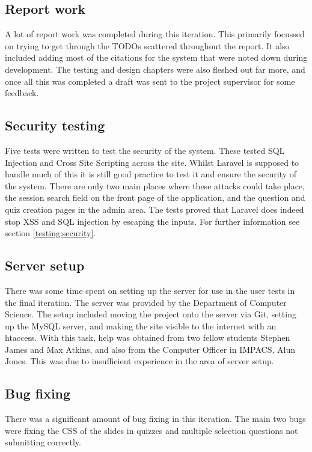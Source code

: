 \subsection{Report work}
A lot of report work was completed during this iteration. This primarily focussed on trying to get through the TODOs scattered throughout the report. It also included adding most of the citations for the system that were noted down during development. The testing and design chapters were also fleshed out far more, and once all this was completed a draft was sent to the project supervisor for some feedback.

\subsection{Security testing}
Five tests were written to test the security of the system. These tested SQL Injection and Cross Site Scripting across the site. Whilst Laravel is supposed to handle much of this it is still good practice to test it and ensure the security of the system. There are only two main places where these attacks could take place, the session search field on the front page of the application, and the question and quiz creation pages in the admin area. The tests proved that Laravel does indeed stop XSS and SQL injection by escaping the inputs. For further information see section \ref{testing:security}.

\subsection{Server setup}
There was some time spent on setting up the server for use in the user tests in the final iteration. The server was provided by the Department of Computer Science. The setup included moving the project onto the server via Git, setting up the MySQL server, and making the site visible to the internet with an htaccess. With this task, help was obtained from two fellow students Stephen James and Max Atkins, and also from the Computer Officer in IMPACS, Alun Jones. This was due to insufficient experience in the area of server setup.

\subsection{Bug fixing}
There was a significant amount of bug fixing in this iteration. The main two bugs were fixing the CSS of the slides in quizzes and multiple selection questions not submitting correctly. 

